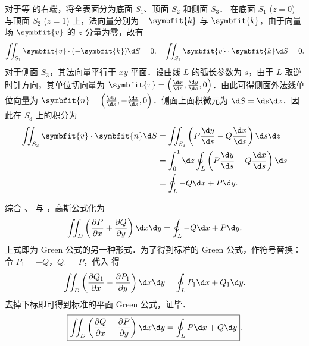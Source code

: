 \begin{myproof}
    对于等  的右端，将全表面分为底面 $S_1$、顶面 $S_2$ 和侧面 $S_3$．
    在底面 $S_1$ ($z=0$) 与顶面 $S_2$ ($z=1$) 上，法向量分别为 $-\symbfit{k}$ 与 $\symbfit{k}$，由于向量场 $\symbfit{v}$ 的 $z$ 分量为零，故有
    \begin{equation}
        \label{eq:top-bottom-flux}
        \iint_{S_1} \symbfit{v} \cdot (-\symbfit{k}) \d S = 0, \quad \iint_{S_2} \symbfit{v} \cdot \symbfit{k} \d S = 0.
    \end{equation}
    对于侧面 $S_3$，其法向量平行于 $xy$ 平面．设曲线 $L$ 的弧长参数为 $s$，由于 $L$ 取逆时针方向，其单位切向量为 $\symbfit{\tau} = \left(\frac{\d x}{\d s}, \frac{\d y}{\d s}, 0\right)$．由此可得侧面外法线单位向量为 $\symbfit{n} = \left(\frac{\d y}{\d s}, -\frac{\d x}{\d s}, 0\right)$．侧面上面积微元为 $\d S = \d s \d z$．因此在 $S_3$ 上的积分为
    \begin{equation}
        \label{eq:side-flux}
        \begin{aligned}
            \iint_{S_3} \symbfit{v} \cdot \symbfit{n} \d S & = \iint_{S_3} \left( P \frac{\d y}{\d s} - Q \frac{\d x}{\d s} \right) \d s \d z      \\
                                                           & = \int_0^1 \d z \oint_L \left( P \frac{\d y}{\d s} - Q \frac{\d x}{\d s} \right) \d s \\
                                                           & = \oint_L -Q \d x + P \d y.
        \end{aligned}
    \end{equation}

    综合 、 与 ，高斯公式化为
    \begin{equation}
        \label{eq:green-temp}
        \iint_D \left( \frac{\partial P}{\partial x} + \frac{\partial Q}{\partial y} \right) \d x \d y = \oint_L -Q \d x + P \d y.
    \end{equation}
    上式即为 Green 公式的另一种形式．为了得到标准的 Green 公式，作符号替换：令 $P_1 = -Q$，$Q_1 = P$，代入  得
    \begin{equation}
        \label{eq:green-standard}
        \iint_D \left( \frac{\partial Q_1}{\partial x} - \frac{\partial P_1}{\partial y} \right) \d x \d y = \oint_L P_1 \d x + Q_1 \d y.
    \end{equation}
    去掉下标即可得到标准的平面 Green 公式，证毕．
    \begin{equation}
        \label{eq:final-proof-2}
        \boxed{\iint_D \left( \frac{\partial Q}{\partial x} - \frac{\partial P}{\partial y} \right) \d x \d y = \oint_L P \d x + Q \d y}.
    \end{equation}
\end{myproof}

